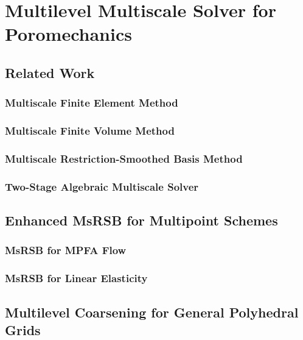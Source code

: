 \chapter{Multilevel Multiscale Solver for Poromechanics}

\section{Related Work}

\subsection{Multiscale Finite Element Method}

\subsection{Multiscale Finite Volume Method}

\subsection{Multiscale Restriction-Smoothed Basis Method}

\subsection{Two-Stage Algebraic Multiscale Solver}

\section{Enhanced MsRSB for Multipoint Schemes}

\subsection{MsRSB for MPFA Flow}

\subsection{MsRSB for Linear Elasticity}

\section{Multilevel Coarsening for General Polyhedral Grids}

